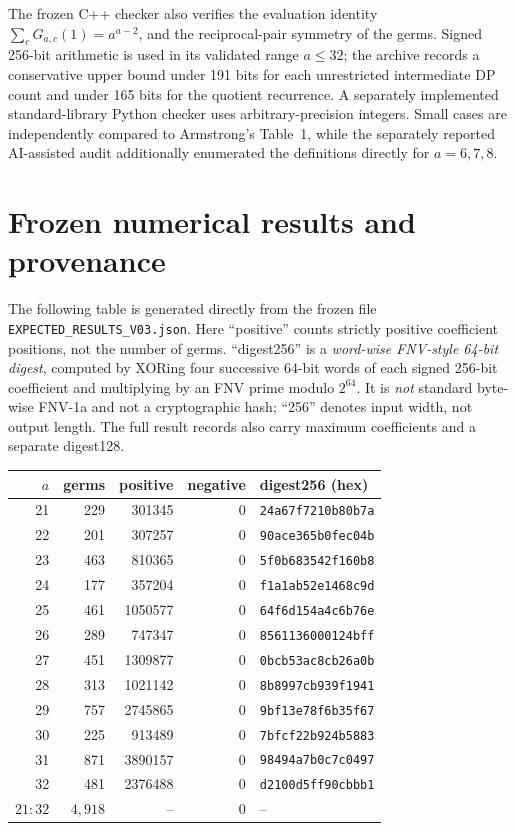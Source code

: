 \documentclass[11pt,a4paper]{article}
\begin{document}
The frozen C++ checker also verifies the evaluation identity $\sum_c G_{a,c}(1)=a^{a-2}$, and the reciprocal-pair symmetry of the germs. Signed 256-bit arithmetic is used in its validated range $a\le32$; the archive records a conservative upper bound under 191 bits for each unrestricted intermediate DP count and under 165 bits for the quotient recurrence. A separately implemented standard-library Python checker uses arbitrary-precision integers. Small cases are independently compared to Armstrong's Table~1, while the separately reported AI-assisted audit additionally enumerated the definitions directly for $a=6,7,8$.

\section{Frozen numerical results and provenance}
The following table is generated directly from the frozen file \nolinkurl{EXPECTED_RESULTS_V03.json}. Here ``positive'' counts strictly positive coefficient positions, not the number of germs. ``digest256'' is a \emph{word-wise FNV-style 64-bit digest}, computed by XORing four successive 64-bit words of each signed 256-bit coefficient and multiplying by an FNV prime modulo $2^{64}$. It is \emph{not} standard byte-wise FNV-1a and not a cryptographic hash; ``256'' denotes input width, not output length. The full result records also carry maximum coefficients and a separate digest128.

\begin{center}
\small
\setlength{\tabcolsep}{5pt}
\begin{tabular}{r r r r l}
\toprule
$a$ & germs & positive & negative & digest256 (hex)\\
\midrule
21 & 229 & 301345 & 0 & \texttt{24a67f7210b80b7a}\\
22 & 201 & 307257 & 0 & \texttt{90ace365b0fec04b}\\
23 & 463 & 810365 & 0 & \texttt{5f0b683542f160b8}\\
24 & 177 & 357204 & 0 & \texttt{f1a1ab52e1468c9d}\\
25 & 461 & 1050577 & 0 & \texttt{64f6d154a4c6b76e}\\
26 & 289 & 747347 & 0 & \texttt{8561136000124bff}\\
27 & 451 & 1309877 & 0 & \texttt{0bcb53ac8cb26a0b}\\
28 & 313 & 1021142 & 0 & \texttt{8b8997cb939f1941}\\
29 & 757 & 2745865 & 0 & \texttt{9bf13e78f6b35f67}\\
30 & 225 & 913489 & 0 & \texttt{7bfcf22b924b5883}\\
31 & 871 & 3890157 & 0 & \texttt{98494a7b0c7c0497}\\
32 & 481 & 2376488 & 0 & \texttt{d2100d5ff90cbbb1}\\
\midrule
$21\!:\!32$ & $4{,}918$ & -- & $0$ & --\\
\bottomrule
\end{tabular}
\end{center}
\end{document}
